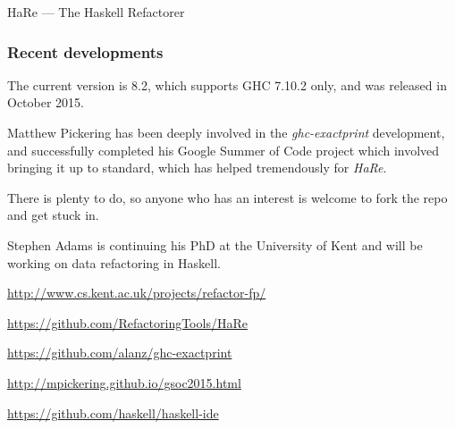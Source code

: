 \documentclass[DIV16,twocolumn,10pt]{scrreprt}
\begin{document}
\begin{hcarentry}[updated]{HaRe --- The Haskell Refactorer}
\subsubsection*{Recent developments}
\begin{compactitem}

\item The current version is 8.2, which supports GHC 7.10.2 only, and was
  released in October 2015.

\item Matthew Pickering has been deeply involved in the \emph{ghc-exactprint}
  development, and successfully completed his Google Summer of Code project
  which involved bringing it up to standard, which has helped tremendously for
  \emph{HaRe}.

\item There is plenty to do, so anyone who has an interest is welcome
  to fork the repo and get stuck in.

\item Stephen Adams is continuing his PhD at the University of Kent and
  will be working on data refactoring in Haskell.
\end{compactitem}

\FurtherReading
\begin{compactitem}
\item \url{http://www.cs.kent.ac.uk/projects/refactor-fp/}
\item \url{https://github.com/RefactoringTools/HaRe}
\item \url{https://github.com/alanz/ghc-exactprint}
\item \url{http://mpickering.github.io/gsoc2015.html}
\item \url{https://github.com/haskell/haskell-ide}
\end{compactitem}
\end{hcarentry}
\end{document}

